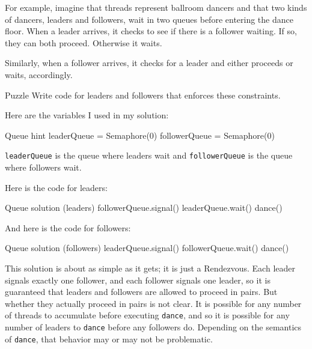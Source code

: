 For example, imagine that threads represent ballroom dancers
and that two kinds of dancers, leaders and followers, wait
in two queues before entering the dance floor.  When a leader
arrives, it checks to see if there is a follower waiting.
If so, they can both proceed.  Otherwise it waits.

Similarly, when a follower arrives, it checks for a leader and
either proceeds or waits, accordingly.

\begin{puzzlebox}{Puzzle}
Write code for leaders and followers that enforces these
constraints.


Here are the variables I used in my solution:

\begin{lstbox}{Queue hint}
leaderQueue = Semaphore(0)
followerQueue = Semaphore(0)
\end{lstbox}

{\tt leaderQueue} is the queue where leaders wait 
and {\tt followerQueue} is the queue where followers wait.
\end{puzzlebox}




Here is the code for leaders:

\begin{lstbox}{Queue solution (leaders)}
followerQueue.signal()
leaderQueue.wait()
dance()
\end{lstbox}

And here is the code for followers:

\begin{lstbox}{Queue solution (followers)}
leaderQueue.signal()
followerQueue.wait()
dance()
\end{lstbox}

This solution is about as simple as it gets; it is just a Rendezvous.
Each leader signals exactly one follower, and each follower signals
one leader, so it is guaranteed that leaders and followers are
allowed to proceed in pairs.  But whether they actually proceed in
pairs is not clear.  It is possible for any number of threads to
accumulate before executing {\tt dance}, and so it is possible for
any number of leaders to {\tt dance} before any followers do.
Depending on the semantics of {\tt dance}, that behavior may or
may not be problematic.


